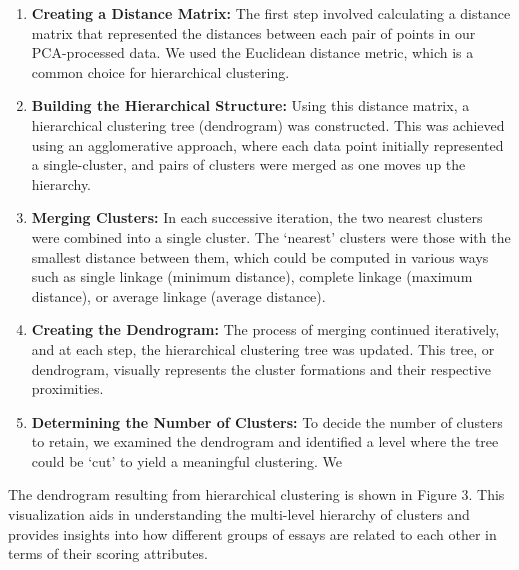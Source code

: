 \documentclass[8pt]{article}
\begin{document}
\begin{enumerate}
    \item \textbf{Creating a Distance Matrix:} The first step involved calculating a distance matrix that represented the distances between each pair of points in our PCA-processed data. We used the Euclidean distance metric, which is a common choice for hierarchical clustering.

    \item \textbf{Building the Hierarchical Structure:} Using this distance matrix, a hierarchical clustering tree (dendrogram) was constructed. This was achieved using an agglomerative approach, where each data point initially represented a single-cluster, and pairs of clusters were merged as one moves up the hierarchy.

    \item \textbf{Merging Clusters:} In each successive iteration, the two nearest clusters were combined into a single cluster. The ‘nearest’ clusters were those with the smallest distance between them, which could be computed in various ways such as single linkage (minimum distance), complete linkage (maximum distance), or average linkage (average distance).

    \item \textbf{Creating the Dendrogram:} The process of merging continued iteratively, and at each step, the hierarchical clustering tree was updated. This tree, or dendrogram, visually represents the cluster formations and their respective proximities.

    \item \textbf{Determining the Number of Clusters:} To decide the number of clusters to retain, we examined the dendrogram and identified a level where the tree could be ‘cut’ to yield a meaningful clustering. We 
\end{enumerate}

The dendrogram resulting from hierarchical clustering is shown in Figure 3. This visualization aids in understanding the multi-level hierarchy of clusters and provides insights into how different groups of essays are related to each other in terms of their scoring attributes.
\end{document}
